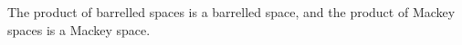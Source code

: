 The product of barrelled spaces is a barrelled space, and the product of Mackey spaces is a Mackey space.

